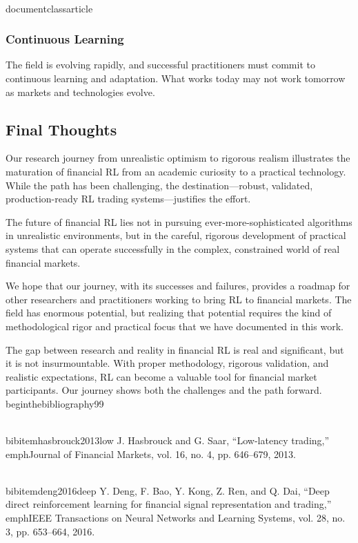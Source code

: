 \\documentclass{article}
\begin{document}
\subsubsection{Continuous Learning}

The field is evolving rapidly, and successful practitioners must commit to continuous learning and adaptation. What works today may not work tomorrow as markets and technologies evolve.

\subsection{Final Thoughts}

Our research journey from unrealistic optimism to rigorous realism illustrates the maturation of financial RL from an academic curiosity to a practical technology. While the path has been challenging, the destination—robust, validated, production-ready RL trading systems—justifies the effort.

The future of financial RL lies not in pursuing ever-more-sophisticated algorithms in unrealistic environments, but in the careful, rigorous development of practical systems that can operate successfully in the complex, constrained world of real financial markets.

We hope that our journey, with its successes and failures, provides a roadmap for other researchers and practitioners working to bring RL to financial markets. The field has enormous potential, but realizing that potential requires the kind of methodological rigor and practical focus that we have documented in this work.

The gap between research and reality in financial RL is real and significant, but it is not insurmountable. With proper methodology, rigorous validation, and realistic expectations, RL can become a valuable tool for financial market participants. Our journey shows both the challenges and the path forward.
\n\n
\\begin{thebibliography}{99}

\\bibitem{hasbrouck2013low}
J. Hasbrouck and G. Saar, ``Low-latency trading,'' \\emph{Journal of Financial Markets}, vol. 16, no. 4, pp. 646--679, 2013.

\\bibitem{deng2016deep}
Y. Deng, F. Bao, Y. Kong, Z. Ren, and Q. Dai, ``Deep direct reinforcement learning for financial signal representation and trading,'' \\emph{IEEE Transactions on Neural Networks and Learning Systems}, vol. 28, no. 3, pp. 653--664, 2016.
\end{document}

